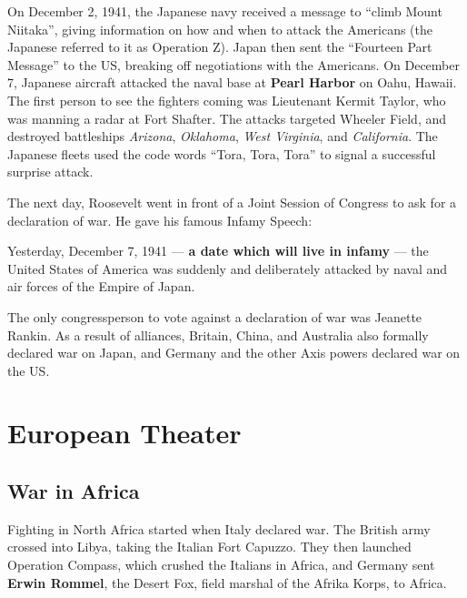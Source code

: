 On December 2, 1941, the Japanese navy received a message to ``climb Mount Niitaka'',
giving information on how and when to attack the Americans (the Japanese referred to it as Operation Z).
Japan then sent the ``Fourteen Part Message'' to the US, breaking off negotiations with the Americans.
On December 7, Japanese aircraft attacked the naval base at \textbf{Pearl Harbor} on Oahu, Hawaii.
The first person to see the fighters coming was Lieutenant Kermit Taylor, who was manning a radar at Fort Shafter.
The attacks targeted Wheeler Field, and destroyed battleships
\textit{Arizona},
\textit{Oklahoma},
\textit{West Virginia},
and \textit{California}.
The Japanese fleets used the code words ``Tora, Tora, Tora'' to signal a successful surprise attack.

The next day, Roosevelt went in front of a Joint Session of Congress to ask for a declaration of war.
He gave his famous Infamy Speech:
\begin{quoting}
  Yesterday, December 7, 1941 --- \textbf{a date which will live in infamy} ---
  the United States of America was suddenly and deliberately attacked by naval and air forces of the Empire of Japan.
\end{quoting}
The only congressperson to vote against a declaration of war was Jeanette Rankin.
As a result of alliances, Britain, China, and Australia also formally declared war on Japan,
and Germany and the other Axis powers declared war on the US\@.

\section{European Theater}

\subsection*{War in Africa}

Fighting in North Africa started when Italy declared war.
The British army crossed into Libya, taking the Italian Fort Capuzzo.
They then launched Operation Compass, which crushed the Italians in Africa,
and Germany sent \textbf{Erwin Rommel}, the Desert Fox, field marshal of the Afrika Korps, to Africa.

